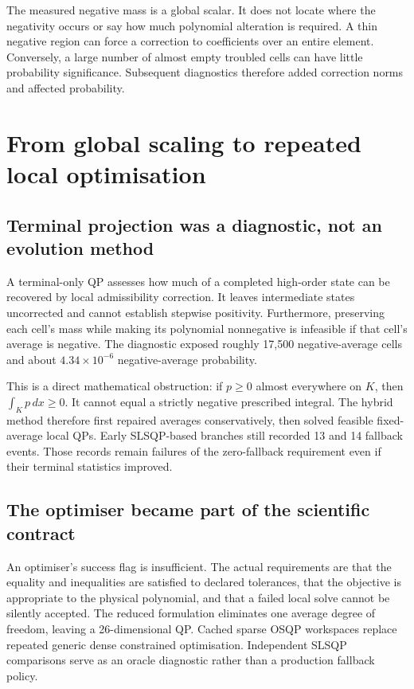 The measured negative mass is a global scalar. It does not locate where the negativity occurs or say how much polynomial alteration is required. A thin negative region can force a correction to coefficients over an entire element. Conversely, a large number of almost empty troubled cells can have little probability significance. Subsequent diagnostics therefore added correction norms and affected probability.

\chapter{From global scaling to repeated local optimisation}
\section{Terminal projection was a diagnostic, not an evolution method}
A terminal-only QP assesses how much of a completed high-order state can be recovered by local admissibility correction. It leaves intermediate states uncorrected and cannot establish stepwise positivity. Furthermore, preserving each cell's mass while making its polynomial nonnegative is infeasible if that cell's average is negative. The diagnostic exposed roughly 17,500 negative-average cells and about $4.34\times10^{-6}$ negative-average probability.

This is a direct mathematical obstruction: if $p\ge0$ almost everywhere on $K$, then $\int_Kp\,dx\ge0$. It cannot equal a strictly negative prescribed integral. The hybrid method therefore first repaired averages conservatively, then solved feasible fixed-average local QPs. Early SLSQP-based branches still recorded 13 and 14 fallback events. Those records remain failures of the zero-fallback requirement even if their terminal statistics improved.

\section{The optimiser became part of the scientific contract}
An optimiser's success flag is insufficient. The actual requirements are that the equality and inequalities are satisfied to declared tolerances, that the objective is appropriate to the physical polynomial, and that a failed local solve cannot be silently accepted. The reduced formulation eliminates one average degree of freedom, leaving a 26-dimensional QP. Cached sparse OSQP workspaces replace repeated generic dense constrained optimisation. Independent SLSQP comparisons serve as an oracle diagnostic rather than a production fallback policy.

